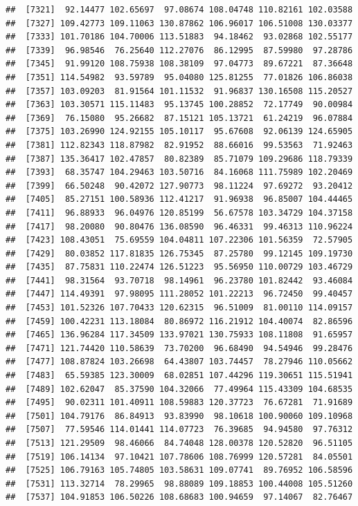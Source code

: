 \documentclass[
]{article}
\begin{document}
\begin{verbatim}
##  [7321]  92.14477 102.65697  97.08674 108.04748 110.82161 102.03588
##  [7327] 109.42773 109.11063 130.87862 106.96017 106.51008 130.03377
##  [7333] 101.70186 104.70006 113.51883  94.18462  93.02868 102.55177
##  [7339]  96.98546  76.25640 112.27076  86.12995  87.59980  97.28786
##  [7345]  91.99120 108.75938 108.38109  97.04773  89.67221  87.36648
##  [7351] 114.54982  93.59789  95.04080 125.81255  77.01826 106.86038
##  [7357] 103.09203  81.91564 101.11532  91.96837 130.16508 115.20527
##  [7363] 103.30571 115.11483  95.13745 100.28852  72.17749  90.00984
##  [7369]  76.15080  95.26682  87.15121 105.13721  61.24219  96.07884
##  [7375] 103.26990 124.92155 105.10117  95.67608  92.06139 124.65905
##  [7381] 112.82343 118.87982  82.91952  88.66016  99.53563  71.92463
##  [7387] 135.36417 102.47857  80.82389  85.71079 109.29686 118.79339
##  [7393]  68.35747 104.29463 103.50716  84.16068 111.75989 102.20469
##  [7399]  66.50248  90.42072 127.90773  98.11224  97.69272  93.20412
##  [7405]  85.27151 100.58936 112.41217  91.96938  96.85007 104.44465
##  [7411]  96.88933  96.04976 120.85199  56.67578 103.34729 104.37158
##  [7417]  98.20080  90.80476 136.08590  96.46331  99.46313 110.96224
##  [7423] 108.43051  75.69559 104.04811 107.22306 101.56359  72.57905
##  [7429]  80.03852 117.81835 126.75345  87.25780  99.12145 109.19730
##  [7435]  87.75831 110.22474 126.51223  95.56950 110.00729 103.46729
##  [7441]  98.31564  93.70718  98.14961  96.23780 101.82442  93.46084
##  [7447] 114.49391  97.98095 111.28052 101.22213  96.72450  99.40457
##  [7453] 101.52326 107.70433 120.62315  96.51009  81.00110 114.09157
##  [7459] 100.42231 113.18084  80.86972 116.21912 104.40074  82.86596
##  [7465] 136.96284 117.34509 133.97021 130.75933 108.11808  91.65957
##  [7471] 121.74420 110.58639  73.70200  96.68490  94.54946  99.28476
##  [7477] 108.87824 103.26698  64.43807 103.74457  78.27946 110.05662
##  [7483]  65.59385 123.30009  68.02851 107.44296 119.30651 115.51941
##  [7489] 102.62047  85.37590 104.32066  77.49964 115.43309 104.68535
##  [7495]  90.02311 101.40911 108.59883 120.37723  76.67281  71.91689
##  [7501] 104.79176  86.84913  93.83990  98.10618 100.90060 109.10968
##  [7507]  77.59546 114.01441 114.07723  76.39685  94.94580  97.76312
##  [7513] 121.29509  98.46066  84.74048 128.00378 120.52820  96.51105
##  [7519] 106.14134  97.10421 107.78606 108.76999 120.57281  84.05501
##  [7525] 106.79163 105.74805 103.58631 109.07741  89.76952 106.58596
##  [7531] 113.32714  78.29965  98.88089 109.18853 100.44008 105.51260
##  [7537] 104.91853 106.50226 108.68683 100.94659  97.14067  82.76467

\end{verbatim}
\end{document}
